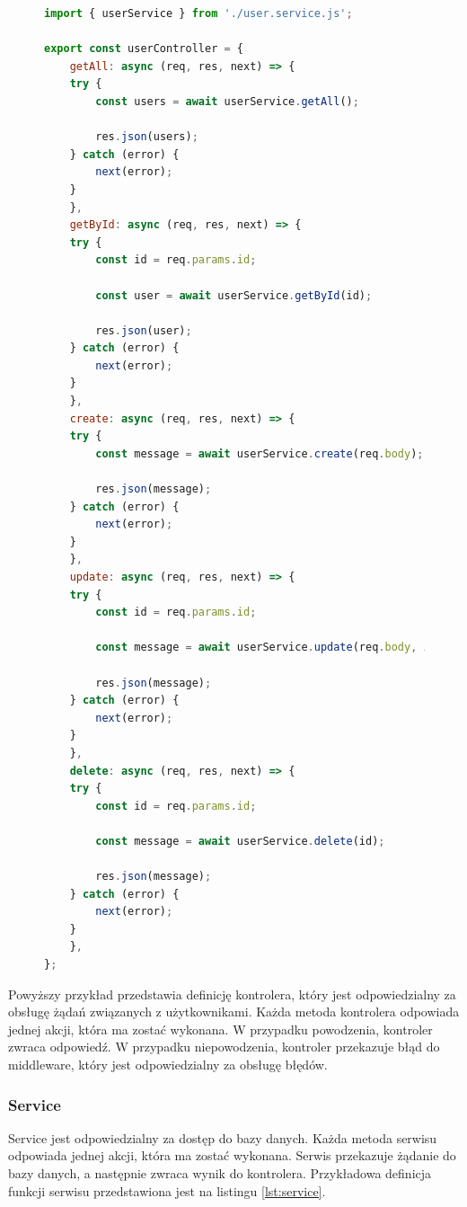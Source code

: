 \begin{figure}[H]
\begin{lstlisting}[language=JavaScript, caption=Przykładowa definicja kontrolera, label=lst:controller]
import { userService } from './user.service.js';

export const userController = {
    getAll: async (req, res, next) => {
    try {
        const users = await userService.getAll();

        res.json(users);
    } catch (error) {
        next(error);
    }
    },
    getById: async (req, res, next) => {
    try {
        const id = req.params.id;

        const user = await userService.getById(id);

        res.json(user);
    } catch (error) {
        next(error);
    }
    },
    create: async (req, res, next) => {
    try {
        const message = await userService.create(req.body);

        res.json(message);
    } catch (error) {
        next(error);
    }
    },
    update: async (req, res, next) => {
    try {
        const id = req.params.id;

        const message = await userService.update(req.body, id);

        res.json(message);
    } catch (error) {
        next(error);
    }
    },
    delete: async (req, res, next) => {
    try {
        const id = req.params.id;

        const message = await userService.delete(id);

        res.json(message);
    } catch (error) {
        next(error);
    }
    },
};        
\end{lstlisting}
\end{figure}

Powyższy przykład przedstawia definicję kontrolera, który jest odpowiedzialny za obsługę żądań związanych z użytkownikami. Każda metoda kontrolera odpowiada jednej akcji, która ma zostać wykonana. W przypadku powodzenia, kontroler zwraca odpowiedź. W przypadku niepowodzenia, kontroler przekazuje błąd do middleware, który jest odpowiedzialny za obsługę błędów.

\subsubsection{Service}
Service jest odpowiedzialny za dostęp do bazy danych. Każda metoda serwisu odpowiada jednej akcji, która ma zostać wykonana. Serwis przekazuje żądanie do bazy danych, a następnie zwraca wynik do kontrolera. Przykładowa definicja funkcji serwisu przedstawiona jest na listingu \ref{lst:service}.

